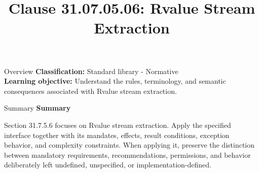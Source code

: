 \documentclass[10pt,letterpaper]{article}
\title{Clause 31.07.05.06: Rvalue Stream Extraction}
\author{}
\date{}
\begin{document}
\maketitle
\begin{CornellOverviewBox}{Overview}
\textbf{Classification:} Standard library - Normative\\[2pt]
\textbf{Learning objective:} Understand the rules, terminology, and semantic consequences associated with Rvalue stream extraction.
\end{CornellOverviewBox}\begin{CornellSummaryBox}{Summary}
{\sffamily\bfseries\color{Accent} Summary}\par\vspace{3pt}Section 31.7.5.6 focuses on Rvalue stream extraction. Apply the specified interface together with its mandates, effects, result conditions, exception behavior, and complexity constraints. When applying it, preserve the distinction between mandatory requirements, recommendations, permissions, and behavior deliberately left undefined, unspecified, or implementation-defined.
\end{CornellSummaryBox}
\end{document}
